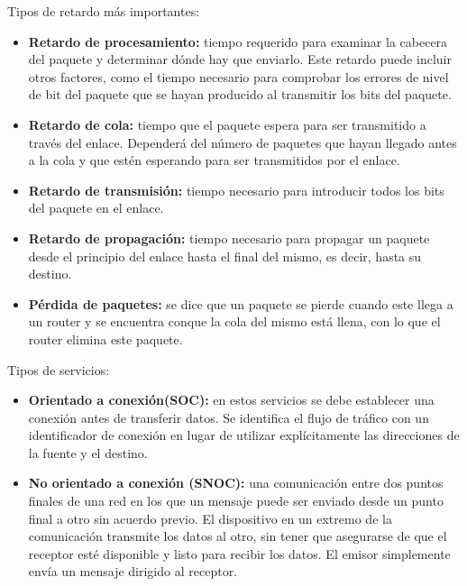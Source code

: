 \documentclass[a4paper,11pt]{article}
\begin{document}
Tipos de retardo más importantes:
\begin{itemize}
\item \textbf{Retardo de procesamiento:} tiempo requerido para examinar la cabecera del paquete y determinar dónde hay que enviarlo. Este retardo puede incluir otros factores, como el tiempo necesario para comprobar los errores de nivel de bit del paquete que se hayan producido al transmitir los bits del paquete.

\item \textbf{Retardo de cola:} tiempo que el paquete espera para ser transmitido a través del enlace. Dependerá del número de paquetes que hayan llegado antes a la cola y que estén esperando para ser transmitidos por el enlace. 

\item \textbf{Retardo de transmisión:} tiempo necesario para introducir todos los bits del paquete en el enlace.

\item \textbf{Retardo de propagación:} tiempo necesario para propagar un paquete desde el principio del enlace hasta el final del mismo, es decir, hasta su destino.

\item \textbf{Pérdida de paquetes:} se dice que un paquete se pierde cuando este llega a un router y se encuentra conque la cola del mismo está llena, con lo que el router elimina este paquete.

\end{itemize}

Tipos de servicios:

\begin{itemize}
\item \textbf{Orientado a conexión(SOC):} en estos servicios se debe establecer una conexión antes de transferir datos. Se identifica el flujo de tráfico con un identificador de conexión en lugar de utilizar explícitamente las direcciones de la fuente y el destino.

\item \textbf{No orientado a conexión (SNOC):} una comunicación entre dos puntos finales de una red en los que un mensaje puede ser enviado desde un punto final a otro sin acuerdo previo. El dispositivo en un extremo de la comunicación transmite los datos al otro, sin tener que asegurarse de que el receptor esté disponible y listo para recibir los datos. El emisor simplemente envía un mensaje dirigido al receptor.
\end{itemize}
\end{document}
